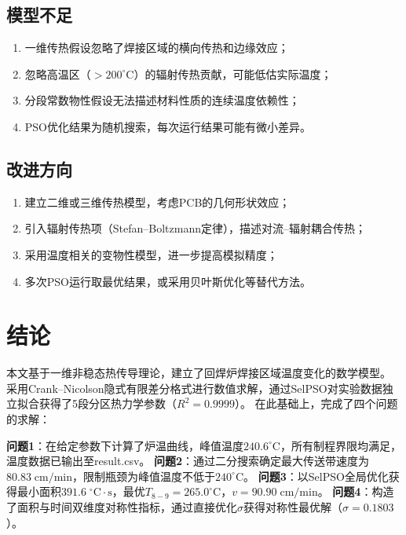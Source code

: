 \documentclass[12pt,a4paper]{ctexart}
\begin{document}
\subsection{模型不足}

\begin{enumerate}[nosep]
    \item 一维传热假设忽略了焊接区域的横向传热和边缘效应；
    \item 忽略高温区（$>$$200^{\circ}\mathrm{C}$）的辐射传热贡献，可能低估实际温度；
    \item 分段常数物性假设无法描述材料性质的连续温度依赖性；
    \item PSO优化结果为随机搜索，每次运行结果可能有微小差异。
\end{enumerate}

\subsection{改进方向}

\begin{enumerate}[nosep]
    \item 建立二维或三维传热模型，考虑PCB的几何形状效应；
    \item 引入辐射传热项（Stefan--Boltzmann定律），描述对流--辐射耦合传热；
    \item 采用温度相关的变物性模型，进一步提高模拟精度；
    \item 多次PSO运行取最优结果，或采用贝叶斯优化等替代方法。
\end{enumerate}

\section{结论}

本文基于一维非稳态热传导理论，建立了回焊炉焊接区域温度变化的数学模型。
采用Crank--Nicolson隐式有限差分格式进行数值求解，通过SelPSO对实验数据独立拟合获得了5段分区热力学参数（$R^2=0.9999$）。
在此基础上，完成了四个问题的求解：

\textbf{问题1}：在给定参数下计算了炉温曲线，峰值温度$240.6^{\circ}\mathrm{C}$，所有制程界限均满足，温度数据已输出至result.csv。
\textbf{问题2}：通过二分搜索确定最大传送带速度为$80.83\;\mathrm{cm/min}$，限制瓶颈为峰值温度不低于$240^{\circ}\mathrm{C}$。
\textbf{问题3}：以SelPSO全局优化获得最小面积$391.6\;^{\circ}\mathrm{C}\!\cdot\!\mathrm{s}$，最优$T_{8-9}=265.0^{\circ}\mathrm{C}$，$v=90.90\;\mathrm{cm/min}$。
\textbf{问题4}：构造了面积与时间双维度对称性指标，通过直接优化$\sigma$获得对称性最优解（$\sigma=0.1803$）。
\end{document}
